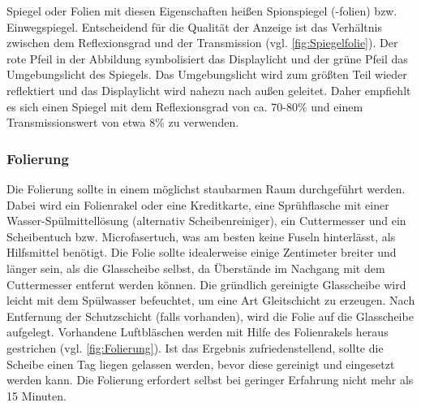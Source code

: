 Spiegel oder Folien mit diesen Eigenschaften heißen Spionspiegel (-folien) bzw. Einwegspiegel. Entscheidend für die Qualität der Anzeige ist das Verhältnis zwischen dem Reflexionsgrad und der Transmission (vgl. \autoref{fig:Spiegelfolie}). Der rote Pfeil in der Abbildung symbolisiert das Displaylicht und der grüne Pfeil das Umgebungslicht des Spiegels. Das Umgebungslicht wird zum größten Teil wieder reflektiert und das Displaylicht wird nahezu nach außen geleitet. Daher empfiehlt es sich einen Spiegel mit dem Reflexionsgrad von ca. 70-80\% und einem Transmissionswert von etwa 8\% zu verwenden. 


\subsubsection*{Folierung}
Die Folierung sollte in einem möglichst staubarmen Raum durchgeführt werden. Dabei wird 
ein Folienrakel oder eine Kreditkarte, eine Sprühflasche mit einer Wasser-Spülmittellösung (alternativ Scheibenreiniger), ein Cuttermesser und ein Scheibentuch bzw. Microfasertuch, was am besten keine Fuseln hinterlässt, als Hilfsmittel benötigt.
Die Folie sollte idealerweise einige Zentimeter breiter und länger sein, als die Glasscheibe selbst, da Überstände im Nachgang mit dem Cuttermesser entfernt werden können. Die gründlich gereinigte Glasscheibe wird leicht mit dem Spülwasser befeuchtet, um eine Art Gleitschicht zu erzeugen. Nach Entfernung der Schutzschicht (falls vorhanden), wird die Folie auf die Glasscheibe aufgelegt. Vorhandene Luftbläschen werden mit Hilfe des Folienrakels heraus gestrichen (vgl. \autoref{fig:Folierung}). Ist das Ergebnis zufriedenstellend, sollte die Scheibe einen Tag liegen gelassen werden, bevor diese gereinigt und eingesetzt werden kann. Die Folierung erfordert selbst bei geringer Erfahrung nicht mehr als 15 Minuten. 

